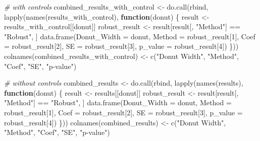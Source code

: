 \documentclass[
]{article}
\newenvironment{Shaded}{\begin{snugshade}}{\end{snugshade}}
\newcommand{\AttributeTok}[1]{\textcolor[rgb]{0.77,0.63,0.00}{#1}}
\newcommand{\CommentTok}[1]{\textcolor[rgb]{0.56,0.35,0.01}{\textit{#1}}}
\newcommand{\ControlFlowTok}[1]{\textcolor[rgb]{0.13,0.29,0.53}{\textbf{#1}}}
\newcommand{\DecValTok}[1]{\textcolor[rgb]{0.00,0.00,0.81}{#1}}
\newcommand{\FunctionTok}[1]{\textcolor[rgb]{0.00,0.00,0.00}{#1}}
\newcommand{\NormalTok}[1]{#1}
\newcommand{\OtherTok}[1]{\textcolor[rgb]{0.56,0.35,0.01}{#1}}
\newcommand{\SpecialCharTok}[1]{\textcolor[rgb]{0.00,0.00,0.00}{#1}}
\newcommand{\StringTok}[1]{\textcolor[rgb]{0.31,0.60,0.02}{#1}}
\begin{document}
\begin{Shaded}
\begin{Highlighting}[]
\CommentTok{\# with controls}
\NormalTok{combined\_results\_with\_control }\OtherTok{\textless{}{-}} \FunctionTok{do.call}\NormalTok{(rbind, }\FunctionTok{lapply}\NormalTok{(}\FunctionTok{names}\NormalTok{(results\_with\_control),}
    \ControlFlowTok{function}\NormalTok{(donut) \{}
\NormalTok{        result }\OtherTok{\textless{}{-}}\NormalTok{ results\_with\_control[[donut]]}
\NormalTok{        robust\_result }\OtherTok{\textless{}{-}}\NormalTok{ result[result[, }\StringTok{"Method"}\NormalTok{] }\SpecialCharTok{==} \StringTok{"Robust"}\NormalTok{, ]}
        \FunctionTok{data.frame}\NormalTok{(}\AttributeTok{Donut\_Width =}\NormalTok{ donut, }\AttributeTok{Method =}\NormalTok{ robust\_result[}\DecValTok{1}\NormalTok{], }\AttributeTok{Coef =}\NormalTok{ robust\_result[}\DecValTok{2}\NormalTok{],}
            \AttributeTok{SE =}\NormalTok{ robust\_result[}\DecValTok{3}\NormalTok{], }\AttributeTok{p\_value =}\NormalTok{ robust\_result[}\DecValTok{4}\NormalTok{])}
\NormalTok{    \}))}
\FunctionTok{colnames}\NormalTok{(combined\_results\_with\_control) }\OtherTok{\textless{}{-}} \FunctionTok{c}\NormalTok{(}\StringTok{"Donut Width"}\NormalTok{, }\StringTok{"Method"}\NormalTok{, }\StringTok{"Coef"}\NormalTok{, }\StringTok{"SE"}\NormalTok{,}
    \StringTok{"p{-}value"}\NormalTok{)}

\CommentTok{\# without controls}
\NormalTok{combined\_results }\OtherTok{\textless{}{-}} \FunctionTok{do.call}\NormalTok{(rbind, }\FunctionTok{lapply}\NormalTok{(}\FunctionTok{names}\NormalTok{(results), }\ControlFlowTok{function}\NormalTok{(donut) \{}
\NormalTok{    result }\OtherTok{\textless{}{-}}\NormalTok{ results[[donut]]}
\NormalTok{    robust\_result }\OtherTok{\textless{}{-}}\NormalTok{ result[result[, }\StringTok{"Method"}\NormalTok{] }\SpecialCharTok{==} \StringTok{"Robust"}\NormalTok{, ]}
    \FunctionTok{data.frame}\NormalTok{(}\AttributeTok{Donut\_Width =}\NormalTok{ donut, }\AttributeTok{Method =}\NormalTok{ robust\_result[}\DecValTok{1}\NormalTok{], }\AttributeTok{Coef =}\NormalTok{ robust\_result[}\DecValTok{2}\NormalTok{],}
        \AttributeTok{SE =}\NormalTok{ robust\_result[}\DecValTok{3}\NormalTok{], }\AttributeTok{p\_value =}\NormalTok{ robust\_result[}\DecValTok{4}\NormalTok{])}
\NormalTok{\}))}
\FunctionTok{colnames}\NormalTok{(combined\_results) }\OtherTok{\textless{}{-}} \FunctionTok{c}\NormalTok{(}\StringTok{"Donut Width"}\NormalTok{, }\StringTok{"Method"}\NormalTok{, }\StringTok{"Coef"}\NormalTok{, }\StringTok{"SE"}\NormalTok{, }\StringTok{"p{-}value"}\NormalTok{)}


\end{Highlighting}
\end{Shaded}
\end{document}
